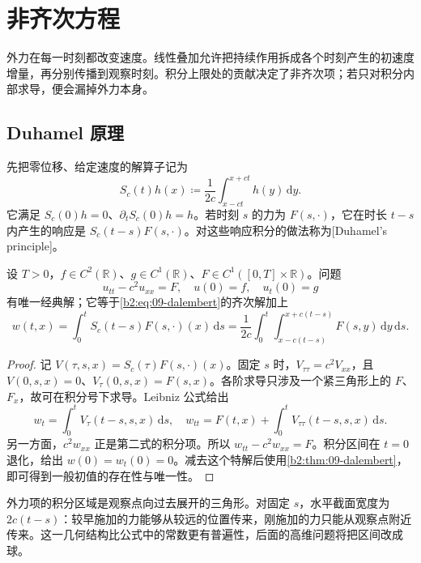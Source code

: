 \section{非齐次方程}
\label{b2:sec:0902}

外力在每一时刻都改变速度。线性叠加允许把持续作用拆成各个时刻产生的初速度增量，再分别传播到观察时刻。积分上限处的贡献决定了非齐次项；若只对积分内部求导，便会漏掉外力本身。

\subsection{Duhamel 原理}
\label{b2:subsec:090201}

先把零位移、给定速度的解算子记为
\[
 S_c(t)h(x)\coloneqq\dfrac1{2c}\int_{x-ct}^{x+ct}h(y)\,\mathrm{d}y.
\]
它满足 \(S_c(0)h=0\)、\(\partial_tS_c(0)h=h\)。若时刻 \(s\) 的力为 \(F(s,\cdot)\)，它在时长 \(t-s\) 内产生的响应是 \(S_c(t-s)F(s,\cdot)\)。对这些响应积分的做法称为[Duhamel's principle]。

\begin{theorem}\label{b2:thm:09-duhamel}
设 \(T>0\)，\(f\in C^2(\mathbb R)\)、\(g\in C^1(\mathbb R)\)、\(F\in C^1([0,T]\times\mathbb R)\)。问题
\[
 u_{tt}-c^2u_{xx}=F,\quad u(0)=f,\quad u_t(0)=g
\]
有唯一经典解；它等于\eqref{b2:eq:09-dalembert}的齐次解加上
\begin{equation}\label{b2:eq:09-duhamel}
 w(t,x)=\int_0^tS_c(t-s)F(s,\cdot)(x)\,\mathrm{d}s
 =\dfrac1{2c}\int_0^t\int_{x-c(t-s)}^{x+c(t-s)}F(s,y)\,\mathrm{d}y\,\mathrm{d}s.
\end{equation}
\end{theorem}
\begin{proof}
记 \(V(\tau,s,x)=S_c(\tau)F(s,\cdot)(x)\)。固定 \(s\) 时，\(V_{\tau\tau}=c^2V_{xx}\)，且 \(V(0,s,x)=0\)、\(V_\tau(0,s,x)=F(s,x)\)。各阶求导只涉及一个紧三角形上的 \(F\)、\(F_x\)，故可在积分号下求导。Leibniz 公式给出
\[
 w_t=\int_0^tV_\tau(t-s,s,x)\,\mathrm{d}s,\quad
 w_{tt}=F(t,x)+\int_0^tV_{\tau\tau}(t-s,s,x)\,\mathrm{d}s.
\]
另一方面，\(c^2w_{xx}\) 正是第二式的积分项。所以 \(w_{tt}-c^2w_{xx}=F\)。积分区间在 \(t=0\) 退化，给出 \(w(0)=w_t(0)=0\)。减去这个特解后使用\cref{b2:thm:09-dalembert}，即可得到一般初值的存在性与唯一性。
\end{proof}

外力项的积分区域是观察点向过去展开的三角形。对固定 \(s\)，水平截面宽度为 \(2c(t-s)\)：较早施加的力能够从较远的位置传来，刚施加的力只能从观察点附近传来。这一几何结构比公式中的常数更有普遍性，后面的高维问题将把区间改成球。

